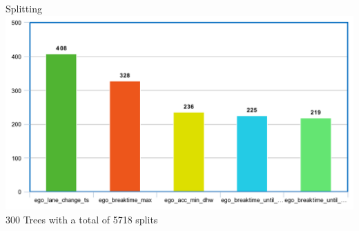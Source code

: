 \documentclass[shortpres]{beamer}
\begin{document}
\begin{frame}{Splitting}
    \centering
    \includegraphics[width=\textwidth]{meta-chart.png}
    300 Trees with a total of 5718 splits
\end{frame}
\end{document}

